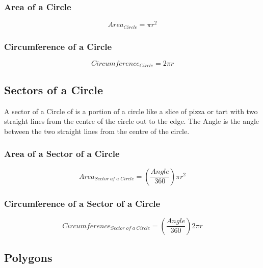 \documentclass{article}
\begin{document}
\subsubsection{Area of a Circle}
\begin{equation}
Area_{ Circle} = \pi r^ 2
\end{equation}
\subsubsection{Circumference of a Circle}
\begin{equation}
Circumference_{ Circle} = 2 \pi r
\end{equation}
\subsection{Sectors of a Circle}
A sector of a Circle of is a portion of a circle like a slice of pizza or tart with two straight lines from the centre of the circle out to the edge. The Angle is the angle between the two straight lines from the centre of the circle.
\subsubsection{Area of a Sector of a Circle}
\begin{equation}
Area_{ Sector\;of\;a\;Circle} = ( \frac{Angle }{ 360 }) \pi r^ 2
\end{equation}


\subsubsection{Circumference of a Sector of a Circle}
\begin{equation}
Circumference_{ Sector\;of\;a\;Circle} = ( \frac{Angle }{ 360} ) 2 \pi r
\end{equation}

\subsection{Polygons}
\end{document}
